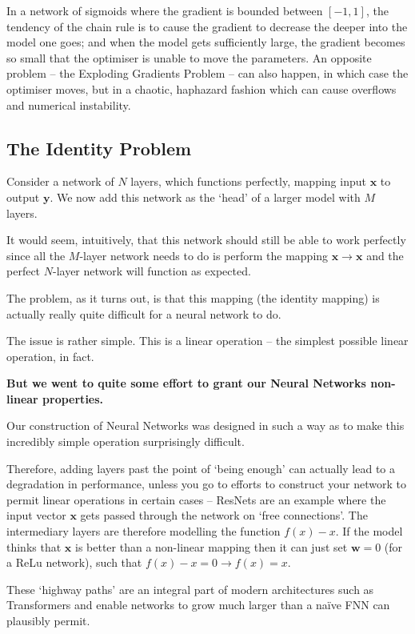 \documentclass[a4paper,openany,11pt]{book}
\renewcommand\vec[1]{\boldsymbol{\mathbf{#1}}}
\begin{document}
					In a network of sigmoids where the gradient is bounded between $[-1,1]$, the tendency of the chain rule is to cause the gradient to decrease the deeper into the model one goes; and when the model gets sufficiently large, the gradient becomes so small that the optimiser is unable to move the parameters. An opposite problem -- the Exploding Gradients Problem -- can also happen, in which case the optimiser moves, but in a chaotic, haphazard fashion which can cause overflows and numerical instability. 

				\subsection{The Identity Problem}

					Consider a network of $N$ layers, which functions perfectly, mapping input $\vec{x}$ to output $\vec{y}$. We now add this network as the `head' of a larger model with $M$ layers. 

					It would seem, intuitively, that this network should still be able to work perfectly since all the $M$-layer network needs to do is perform the mapping $\vec{x} \to \vec{x}$ and the perfect $N$-layer network will function as expected. 

					The problem, as it turns out, is that this mapping (the identity mapping) is actually really quite difficult for a neural network to do. 

					The issue is rather simple. This is a linear operation -- the simplest possible linear operation, in fact.

					\textbf{But we went to quite some effort to grant our Neural Networks non-linear properties.}
					
					Our construction of Neural Networks was designed in such a way as to make this incredibly simple operation surprisingly difficult. 

					Therefore, adding layers past the point of `being enough' can actually lead to a degradation in performance, unless you go to efforts to construct your network to permit linear operations in certain cases -- ResNets are an example where the input vector $\vec{x}$ gets passed through the network on `free connections'. The intermediary layers are therefore modelling the function $f(x) - x$. If the model thinks that $\vec{x}$ is better than a non-linear mapping then it can just set $\vec{w} = 0$ (for a ReLu network), such that $f(x) -x = 0 \to f(x) = x$.


					These `highway paths' are an integral part of modern architectures such as Transformers and enable networks to grow much larger than a na\"ive FNN can plausibly permit.
\end{document}
